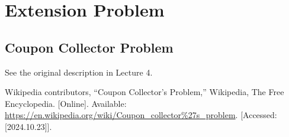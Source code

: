 \documentclass{article}
\begin{document}
\newpage

\section{Extension Problem}
\subsection{Coupon Collector Problem}
See the original description in Lecture 4.




\newpage




\begin{thebibliography}{1}

Wikipedia contributors, ``Coupon Collector's Problem,'' Wikipedia, The Free Encyclopedia. [Online]. Available: \url{https://en.wikipedia.org/wiki/Coupon_collector%27s_problem}. [Accessed: [2024.10.23]].

\end{thebibliography}
\end{document}
